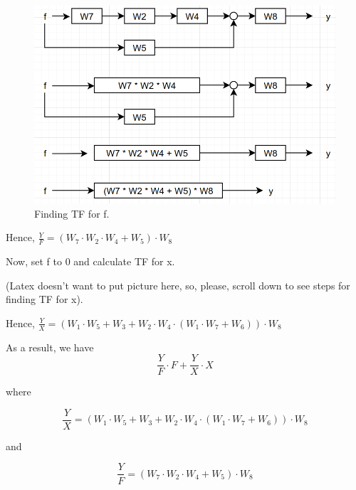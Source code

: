 \documentclass{article}
\begin{document}
         \begin{figure}[hbt!]
            \centering
            \includegraphics[scale=0.3]{hm2_6f.png}
            \caption{Finding TF for f.}
        \end{figure}
        
        Hence, $\frac{Y}{F} = (W_7 \cdot W_2 \cdot W_4 + W_5) \cdot W_8$
        
        \bigbreak
        
        Now, set f to 0 and calculate TF for x.
        
        (Latex doesn't want to put picture here, so, please, scroll down to see steps for finding TF for x).
        \bigbreak
        
        Hence, $\frac{Y}{X} = (W_1 \cdot W_5 + W_3 + W_2 \cdot W_4 \cdot (W_1 \cdot W_7 + W_6)) \cdot W_8$
        
        As a result, we have 
        $$\frac{Y}{F} \cdot F + \frac{Y}{X} \cdot X $$
        
        where
        
        $$\frac{Y}{X} = (W_1 \cdot W_5 + W_3 + W_2 \cdot W_4 \cdot (W_1 \cdot W_7 + W_6)) \cdot W_8$$
        
        and
        
        $$\frac{Y}{F} = (W_7 \cdot W_2 \cdot W_4 + W_5) \cdot W_8$$
        
\end{document}
